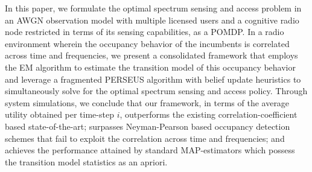 \documentclass[10pt,twocolumn]{IEEEtran}
\begin{document}
In this paper, we formulate the optimal spectrum sensing and access problem in an AWGN observation model with multiple licensed users and a cognitive radio node restricted in terms of its sensing capabilities, as a POMDP. In a radio environment wherein the occupancy behavior of the incumbents is correlated across time and frequencies, we present a consolidated framework that employs the EM algorithm to estimate the transition model of this occupancy behavior and leverage a fragmented PERSEUS algorithm with belief update heuristics to simultaneously solve for the optimal spectrum sensing and access policy. Through system simulations, we conclude that our framework, in terms of the average utility obtained per time-step $i$, outperforms the existing correlation-coefficient based state-of-the-art; surpasses Neyman-Pearson based occupancy detection schemes that fail to exploit the correlation across time and frequencies; and achieves the performance attained by standard MAP-estimators which possess the transition model statistics as an apriori.


\end{document}
